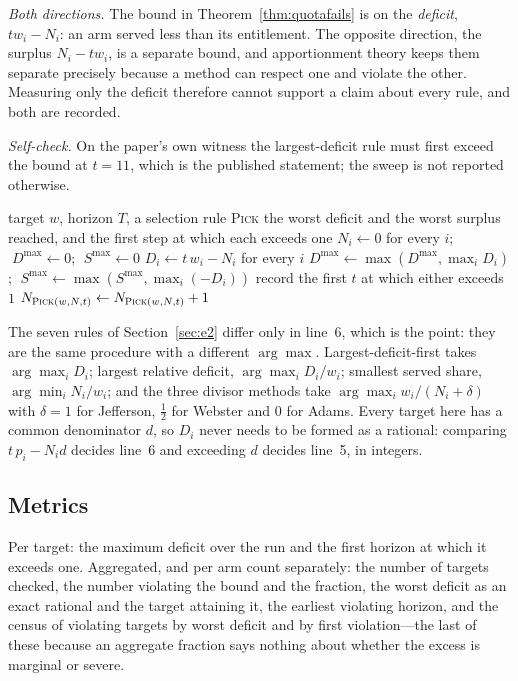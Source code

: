 \emph{Both directions.} The bound in Theorem~\ref{thm:quotafails} is on the \emph{deficit},
$t w_{i}-N_{i}$: an arm served less than its entitlement. The opposite direction, the
surplus $N_{i}-t w_{i}$, is a separate bound, and apportionment theory keeps them separate
precisely because a method can respect one and violate the other. Measuring only the deficit
therefore cannot support a claim about every rule, and both are recorded.

\emph{Self-check.} On the paper's own witness the largest-deficit rule must first exceed the
bound at $t=11$, which is the published statement; the sweep is not reported otherwise.

\begin{algorithm}[htbp]
\caption{Online serving, with the rule as the only pluggable step}
\label{alg:online}
\begin{algorithmic}[1]
\REQUIRE target $w$, horizon $T$, a selection rule \textsc{Pick}
\ENSURE the worst deficit and the worst surplus reached, and the first step at which each
        exceeds one
\STATE $N_{i}\leftarrow0$ for every $i$; $\;D^{\max}\leftarrow0$; $\;S^{\max}\leftarrow0$
  \STATE $D_{i}\leftarrow t\,w_{i}-N_{i}$ for every $i$
  \STATE $D^{\max}\leftarrow\max(D^{\max},\max_{i}D_{i})$;
         $\;S^{\max}\leftarrow\max(S^{\max},\max_{i}(-D_{i}))$
  \STATE record the first $t$ at which either exceeds $1$
    \STATE $N_{\textsc{Pick}(w,N,t)}\leftarrow N_{\textsc{Pick}(w,N,t)}+1$
  \ENDIF
\ENDFOR
\end{algorithmic}
\end{algorithm}

\noindent The seven rules of Section~\ref{sec:e2} differ only in line~6, which is the point:
they are the same procedure with a different $\arg\max$. Largest-deficit-first takes
$\arg\max_{i}D_{i}$; largest relative deficit, $\arg\max_{i}D_{i}/w_{i}$; smallest served
share, $\arg\min_{i}N_{i}/w_{i}$; and the three divisor methods take
$\arg\max_{i}w_{i}/(N_{i}+\delta)$ with $\delta=1$ for Jefferson, $\tfrac12$ for Webster and
$0$ for Adams. Every target here has a common denominator $d$, so $D_{i}$ never needs to be
formed as a rational: comparing $t\,p_{i}-N_{i}d$ decides line~6 and exceeding $d$ decides
line~5, in integers.

\subsection{Metrics}

Per target: the maximum deficit over the run and the first horizon at which it exceeds one.
Aggregated, and per arm count separately: the number of targets checked, the number violating
the bound and the fraction, the worst deficit as an exact rational and the target attaining
it, the earliest violating horizon, and the census of violating targets by worst deficit and
by first violation---the last of these because an aggregate fraction says nothing about
whether the excess is marginal or severe.

